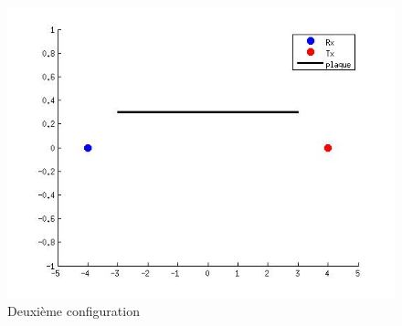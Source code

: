 \documentclass[10pt,a4paper]{article}
\begin{document}
	\begin{figure}[h]
	\centering
	\includegraphics[scale=0.4]{conf2.jpg}
	\caption{Deuxième configuration \label{conf2}}
	\end{figure}		
	
\end{document}
